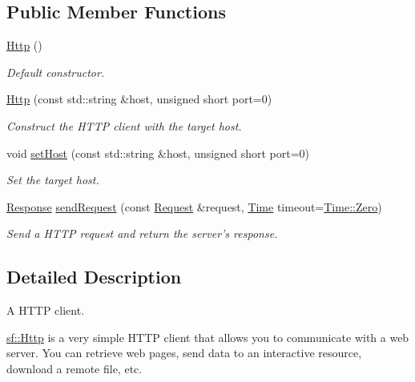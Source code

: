 \subsection*{Public Member Functions}
\begin{DoxyCompactItemize}
\item 
\hypertarget{classsf_1_1Http_abe2360194f99bdde402c9f97a85cf067}{\hyperlink{classsf_1_1Http_abe2360194f99bdde402c9f97a85cf067}{Http} ()}\label{classsf_1_1Http_abe2360194f99bdde402c9f97a85cf067}

\begin{DoxyCompactList}\small\item\em Default constructor. \end{DoxyCompactList}\item 
\hyperlink{classsf_1_1Http_a79efd844a735f083fcce0edbf1092385}{Http} (const std\-::string \&host, unsigned short port=0)
\begin{DoxyCompactList}\small\item\em Construct the H\-T\-T\-P client with the target host. \end{DoxyCompactList}\item 
void \hyperlink{classsf_1_1Http_a55121d543b61c41cf20b885a97b04e65}{set\-Host} (const std\-::string \&host, unsigned short port=0)
\begin{DoxyCompactList}\small\item\em Set the target host. \end{DoxyCompactList}\item 
\hyperlink{classsf_1_1Http_1_1Response}{Response} \hyperlink{classsf_1_1Http_aaf09ebfb5e00dcc82e0d494d5c6a9e2a}{send\-Request} (const \hyperlink{classsf_1_1Http_1_1Request}{Request} \&request, \hyperlink{classsf_1_1Time}{Time} timeout=\hyperlink{classsf_1_1Time_a8db127b632fa8da21550e7282af11fa0}{Time\-::\-Zero})
\begin{DoxyCompactList}\small\item\em Send a H\-T\-T\-P request and return the server's response. \end{DoxyCompactList}\end{DoxyCompactItemize}


\subsection{Detailed Description}
A H\-T\-T\-P client. 

\hyperlink{classsf_1_1Http}{sf\-::\-Http} is a very simple H\-T\-T\-P client that allows you to communicate with a web server. You can retrieve web pages, send data to an interactive resource, download a remote file, etc.

